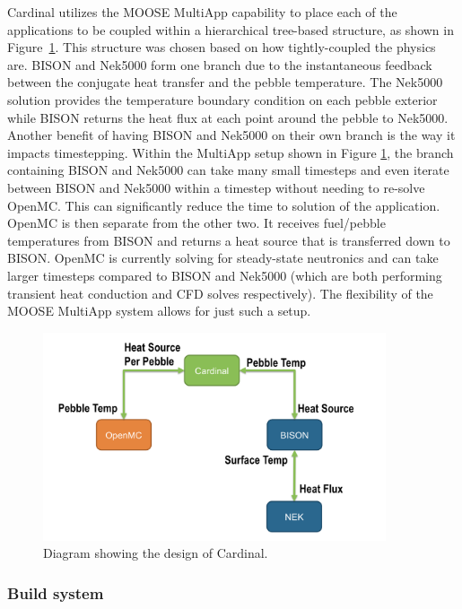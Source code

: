 Cardinal utilizes the MOOSE MultiApp capability to place each of the applications to be coupled within a hierarchical tree-based structure, as shown in Figure~\ref{f:cardinal}. This structure was chosen based on how tightly-coupled the physics are. BISON and Nek5000 form one branch due to the instantaneous feedback between the conjugate heat transfer and the pebble temperature. The Nek5000 solution provides the temperature boundary condition on each pebble exterior while BISON returns the heat flux at each point around the pebble to Nek5000. Another benefit of having BISON and Nek5000 on their own branch is the way it impacts timestepping. Within the MultiApp setup shown in Figure \ref{f:cardinal}, the branch containing BISON and Nek5000 can take many small timesteps and even iterate between BISON and Nek5000 within a timestep without needing to re-solve OpenMC. This can significantly reduce the time to solution of the application. OpenMC is then separate from the other two. It receives fuel/pebble temperatures from BISON and returns a heat source that is transferred down to BISON. OpenMC is currently solving for steady-state neutronics and can take larger timesteps compared to BISON and Nek5000 (which are both performing transient heat conduction and CFD solves respectively). The flexibility of the MOOSE MultiApp system allows for just such a setup.

\begin{figure}[!h]
\centering
\includegraphics[clip=true,width=0.9\textwidth]{Figures/cardinal}
\caption{Diagram showing the design of Cardinal.}
\label{f:cardinal}
\end{figure}

\subsubsection{Build system}
\label{ss:c2}

